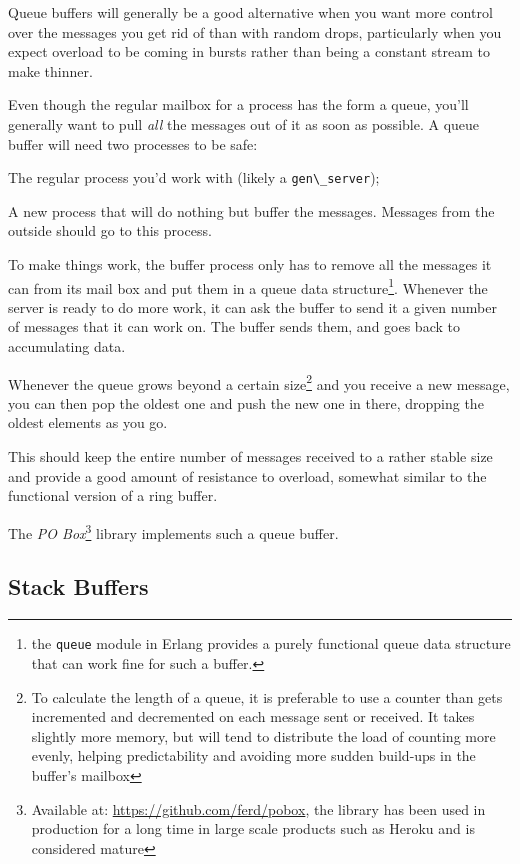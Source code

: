 \documentclass[11pt, oneside]{book}   	%
\newcommand{\module}[1]{\Verb`#1`}
\begin{document}
Queue buffers will generally be a good alternative when you want more control over the messages you get rid of than with random drops, particularly when you expect overload to be coming in bursts rather than being a constant stream to make thinner.

Even though the regular mailbox for a process has the form a queue, you'll generally want to pull \emph{all} the messages out of it as soon as possible. A queue buffer will need two processes to be safe:

\begin{itemize*}
	\item The regular process you'd work with (likely a \module{gen\_server});
	\item A new process that will do nothing but buffer the messages. Messages from the outside should go to this process.
\end{itemize*}

To make things work, the buffer process only has to remove all the messages it can from its mail box and put them in a queue data structure\footnote{the \module{queue} module in Erlang provides a purely functional queue data structure that can work fine for such a buffer.}. Whenever the server is ready to do more work, it can ask the buffer to send it a given number of messages that it can work on. The buffer sends them, and goes back to accumulating data.


Whenever the queue grows beyond a certain size\footnote{To calculate the length of a queue, it is preferable to use a counter than gets incremented and decremented on each message sent or received. It takes slightly more memory, but will tend to distribute the load of counting more evenly, helping predictability and avoiding more sudden build-ups in the buffer's mailbox} and you receive a new message, you can then pop the oldest one and push the new one in there, dropping the oldest elements as you go.

This should keep the entire number of messages received to a rather stable size and provide a good amount of resistance to overload, somewhat similar to the functional version of a ring buffer.

The \emph{PO Box}\footnote{Available at: \href{https://github.com/ferd/pobox}{https://github.com/ferd/pobox}, the library has been used in production for a long time in large scale products such as Heroku and is considered mature} library implements such a queue buffer.

\subsection{Stack Buffers}
\end{document}
